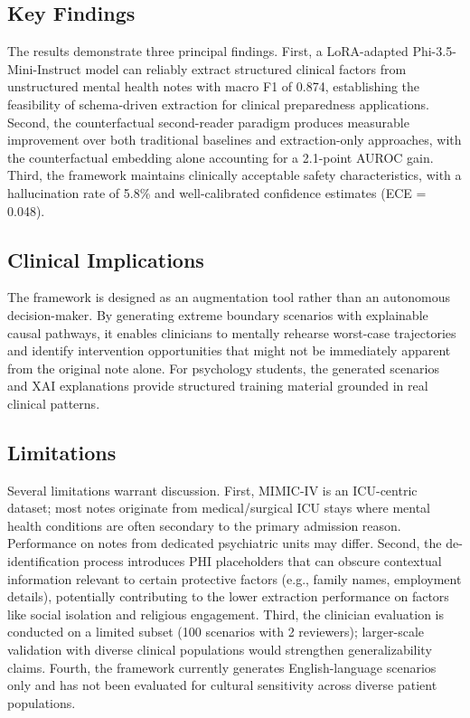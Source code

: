 \documentclass[conference]{IEEEtran}
\begin{document}
\subsection{Key Findings}
The results demonstrate three principal findings. First, a LoRA-adapted Phi-3.5-Mini-Instruct model can reliably extract structured clinical factors from unstructured mental health notes with macro F1 of 0.874, establishing the feasibility of schema-driven extraction for clinical preparedness applications. Second, the counterfactual second-reader paradigm produces measurable improvement over both traditional baselines and extraction-only approaches, with the counterfactual embedding alone accounting for a 2.1-point AUROC gain. Third, the framework maintains clinically acceptable safety characteristics, with a hallucination rate of 5.8\% and well-calibrated confidence estimates (ECE = 0.048).

\subsection{Clinical Implications}
The framework is designed as an augmentation tool rather than an autonomous decision-maker. By generating extreme boundary scenarios with explainable causal pathways, it enables clinicians to mentally rehearse worst-case trajectories and identify intervention opportunities that might not be immediately apparent from the original note alone. For psychology students, the generated scenarios and XAI explanations provide structured training material grounded in real clinical patterns.

\subsection{Limitations}
Several limitations warrant discussion. First, MIMIC-IV is an ICU-centric dataset; most notes originate from medical/surgical ICU stays where mental health conditions are often secondary to the primary admission reason. Performance on notes from dedicated psychiatric units may differ. Second, the de-identification process introduces PHI placeholders that can obscure contextual information relevant to certain protective factors (e.g., family names, employment details), potentially contributing to the lower extraction performance on factors like social isolation and religious engagement. Third, the clinician evaluation is conducted on a limited subset (100 scenarios with 2 reviewers); larger-scale validation with diverse clinical populations would strengthen generalizability claims. Fourth, the framework currently generates English-language scenarios only and has not been evaluated for cultural sensitivity across diverse patient populations.
\end{document}

